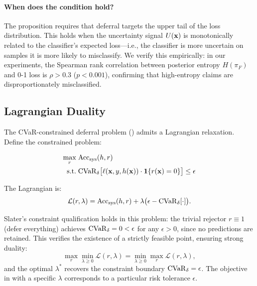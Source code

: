 \paragraph{When does the condition hold?} The proposition requires that deferral targets the upper tail of the loss distribution. This holds when the uncertainty signal $U(\mathbf{x})$ is monotonically related to the classifier's expected loss---i.e., the classifier is more uncertain on samples it is more likely to misclassify. We verify this empirically: in our experiments, the Spearman rank correlation between posterior entropy $H(\pi_F)$ and 0-1 loss is $\rho > 0.3$ ($p < 0.001$), confirming that high-entropy claims are disproportionately misclassified.

\subsection{Lagrangian Duality}

The CVaR-constrained deferral problem () admits a Lagrangian relaxation. Define the constrained problem:

\begin{equation}
\begin{aligned}
\max_{r} \;& \mathrm{Acc}_{\mathrm{sys}}(h, r) \\
\text{s.t.} \;& \mathrm{CVaR}_\delta\bigl[\ell(\mathbf{x}, y, h(\mathbf{x})) \cdot \mathbf{1}\{r(\mathbf{x}) = 0\}\bigr] \leq \epsilon
\end{aligned}
\label{eq:cmdp}
\end{equation}



The Lagrangian is:
\[
\mathcal{L}(r, \lambda) = \mathrm{Acc}_{\mathrm{sys}}(h, r) + \lambda\bigl(\epsilon - \mathrm{CVaR}_\delta[\cdot]\bigr).
\]

Slater's constraint qualification holds in this problem: the trivial rejector $r \equiv 1$ (defer everything) achieves $\mathrm{CVaR}_\delta = 0 < \epsilon$ for any $\epsilon > 0$, since no predictions are retained. This verifies the existence of a strictly feasible point, ensuring strong duality:
\[
\max_{r} \min_{\lambda \geq 0} \mathcal{L}(r, \lambda) = \min_{\lambda \geq 0} \max_{r} \mathcal{L}(r, \lambda),
\]
and the optimal $\lambda^*$ recovers the constraint boundary $\mathrm{CVaR}_\delta = \epsilon$. The objective in  with a specific $\lambda$ corresponds to a particular risk tolerance $\epsilon$.

